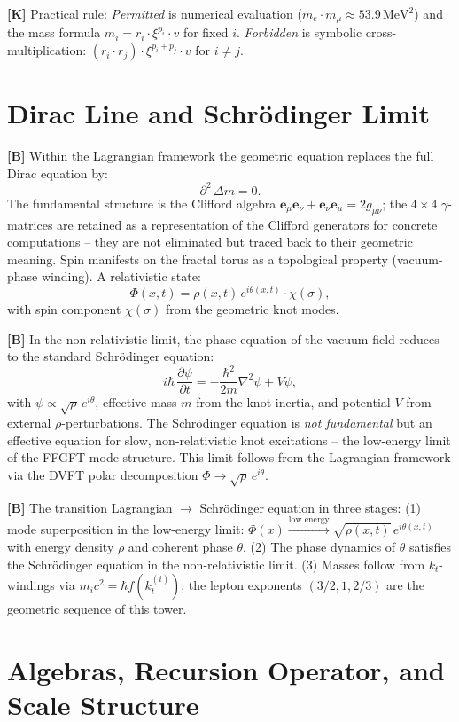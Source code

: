 \textbf{[K]} Practical rule: \emph{Permitted} is numerical evaluation
($m_e\cdot m_\mu\approx53{.}9\,\text{MeV}^2$) and the mass formula
$m_i=r_i\cdot\xi^{p_i}\cdot v$ for fixed $i$. \emph{Forbidden} is symbolic
cross-multiplication: $(r_i\cdot r_j)\cdot\xi^{p_i+p_j}\cdot v$ for $i\neq j$.

\section{Dirac Line and Schrödinger Limit}

\textbf{[B]} Within the Lagrangian framework the geometric equation replaces the
full Dirac equation by:
\[
  \partial^2\,\Delta m = 0.
\]
The fundamental structure is the Clifford algebra
$\mathbf e_\mu\mathbf e_\nu+\mathbf e_\nu\mathbf e_\mu=2g_{\mu\nu}$; the
$4\times4$ $\gamma$-matrices are retained as a representation of the Clifford
generators for concrete computations -- they are not eliminated but traced back
to their geometric meaning. Spin manifests on the fractal torus as a topological
property (vacuum-phase winding). A relativistic state:
\[
  \Phi(x,t) = \rho(x,t)\,e^{i\theta(x,t)}\cdot\chi(\sigma),
\]
with spin component $\chi(\sigma)$ from the geometric knot modes.

\textbf{[B]} In the non-relativistic limit, the phase equation of the vacuum
field reduces to the standard Schrödinger equation:
\[
  i\hbar\,\frac{\partial\psi}{\partial t}
  = -\frac{\hbar^2}{2m}\nabla^2\psi + V\psi,
\]
with $\psi\propto\sqrt\rho\,e^{i\theta}$, effective mass $m$ from the knot
inertia, and potential $V$ from external $\rho$-perturbations. The Schrödinger
equation is \emph{not fundamental} but an effective equation for slow,
non-relativistic knot excitations -- the low-energy limit of the FFGFT mode
structure. This limit follows from the Lagrangian framework via the DVFT polar
decomposition $\Phi\to\sqrt\rho\,e^{i\theta}$.

\textbf{[B]} The transition Lagrangian $\to$ Schrödinger equation in three
stages: (1) mode superposition in the low-energy limit:
$\Phi(x)\xrightarrow{\text{low energy}}\sqrt{\rho(x,t)}\,e^{i\theta(x,t)}$
with energy density $\rho$ and coherent phase $\theta$. (2) The phase dynamics
of $\theta$ satisfies the Schrödinger equation in the non-relativistic limit.
(3) Masses follow from $k_t$-windings via $m_ic^2=\hbar f(k_t^{(i)})$; the
lepton exponents $(3/2,1,2/3)$ are the geometric sequence of this tower.

\section{Algebras, Recursion Operator, and Scale Structure}

